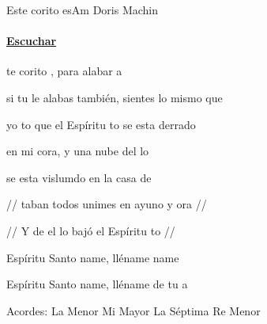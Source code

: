 \documentclass[12pt, spanish]{book}
\newcommand{\NotCCLIed}{\relax}
\begin{document}
    \begin{song}{Este corito es}{Am}
    {} %
    {Doris Machin}
    {} %
    {} %
        \ifChordBk
        \paragraph{\mbox{}\hfill\protect\href{https://open.spotify.com/intl-es/track/6lssdt639iUODSvmnHLDz1}{Escuchar}\mbox{}\hfill}
        \fi


        \begin{SBOpGroup}
            te corito , para alabar a 

            si tu le alabas también, sientes lo mismo que 
        \end{SBOpGroup}

        \begin{SBChorus}
             yo to que el Espíritu to se esta derrado

            en mi cora, y  una nube del lo

            se esta vislumdo en la casa de 
        \end{SBChorus}

        \begin{SBOpGroup}
            // taban todos unimes en ayuno y ora //

            // Y de el lo bajó el Espíritu to //
        \end{SBOpGroup}

        \begin{SBOpGroup}
            Espíritu Santo name, lléname name

            Espíritu Santo name, lléname de tu a
        \end{SBOpGroup}

        \ifChordBk
        \begin{SBOpGroup}
            Acordes:
            \upchord{\Am}\qquad La Menor \hfill
            \upchord{\E}\qquad Mi Mayor \hfill\null\break
            \upchord{\Aseven}\qquad La S\'eptima \hfill
            \upchord{\Dm}\qquad Re Menor \hfill\null\break
        \end{SBOpGroup}
        \fi
    \end{song}
\end{document}
